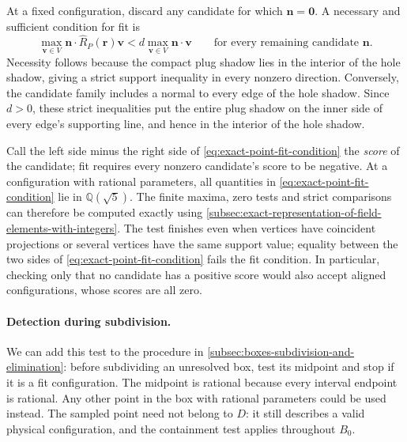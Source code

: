 At a fixed configuration, discard any candidate for which
$\mathbf n=\mathbf0$. A necessary and sufficient condition for fit is
\begin{equation}\label{eq:exact-point-fit-condition}
  \max_{\mathbf v\in V}\mathbf n\cdot\widehat R_P(\mathbf r)\mathbf v
     <d\max_{\mathbf v\in V}\mathbf n\cdot\mathbf v
  \qquad\text{for every remaining candidate }\mathbf n.
\end{equation}
Necessity follows because the compact plug shadow lies in the interior
of the hole shadow, giving a strict support inequality in every nonzero
direction. Conversely, the candidate family includes a normal to every
edge of the hole shadow. Since $d>0$, these strict inequalities put the
entire plug shadow on the inner side of every edge's supporting line,
and hence in the interior of the hole shadow.

Call the left side minus the right side of
\cref{eq:exact-point-fit-condition} the \emph{score} of the candidate; fit
requires every nonzero candidate's score to be negative. At a configuration with rational
parameters, all quantities in \cref{eq:exact-point-fit-condition} lie in
$\mathbb Q(\sqrt5)$. The finite maxima, zero tests and strict comparisons
can therefore be computed exactly using
\cref{subsec:exact-representation-of-field-elements-with-integers}.
The test finishes even when vertices have coincident projections or
several vertices have the same support value; equality between the two
sides of \cref{eq:exact-point-fit-condition} fails the fit condition.
In particular, checking only that no candidate has a
positive score would also accept aligned configurations, whose scores
are all zero.

\paragraph{Detection during subdivision.}
We can add this test to the procedure in
\cref{subsec:boxes-subdivision-and-elimination}: before subdividing an
unresolved box, test its midpoint and stop if it is a fit configuration.
The midpoint is rational because every interval endpoint is rational.
Any other point in the box with rational parameters could be used instead.
The sampled point need not belong to $D$: it still describes a valid
physical configuration, and the containment test applies throughout $B_0$.

